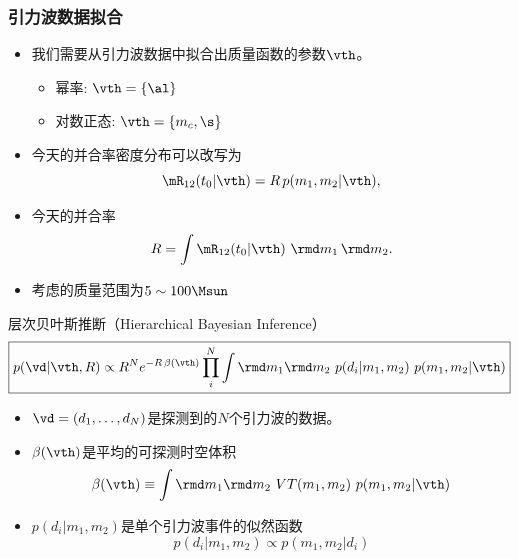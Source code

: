 \documentclass[xcolor={svgnames},compress]{beamer}
\let\olditem\item
\renewcommand{\item}{%
    \olditem\vspace{\fill}}
\begin{document}
\begin{frame}
    \frametitle{引力波数据拟合}
    \begin{itemize}
        \item 我们需要从引力波数据中拟合出质量函数的参数$\vth$。
        \begin{itemize}
            \item 幂率: $\vth = \{\al\}$
            \item 对数正态: $\vth = \{m_c, \s\}$
        \end{itemize}
        
        \item 今天的并合率密度分布可以改写为
        \[ 
        \mR_{12}(t_0|\vth) = R\, p(m_1,m_2|\vth),
        \]
        \item 今天的并合率
        \[
        R = \int \mR_{12}(t_0|\vth)\ \rmd m_1\, \rmd m_2.
        \]
        
        \item 考虑的质量范围为$5\sim 100 \Msun$
    \end{itemize}
    
\end{frame}

\begin{frame}{层次贝叶斯推断（Hierarchical Bayesian Inference）}
    \vspace{-7mm}
    \begin{equation*}\boxed{
            p(\vd|\vth, R) \propto R^{N} e^{-R\, \beta(\vth)} \prod_i^N 
            \int \rmd m_1 \rmd m_2\ p(d_i|m_1, m_2)\ p(m_1, m_2|\vth)
        }
    \end{equation*}
    
    \begin{itemize}
        \item $\vd = (d_1, \dots, d_N)$是探测到的$N$个引力波的数据。
        
        \item $\beta(\vth)$是平均的可探测时空体积
        \[ 
        \beta(\vth) \equiv \int \rmd m_1 \rmd m_2 \ VT(m_1, m_2)\ p(m_1, m_2|\vth)
        \]
        \item $p(d_i|m_1, m_2)$是单个引力波事件的似然函数
        \[
        p(d_i|m_1, m_2) \propto p(m_1, m_2|d_i)
        \]
    \end{itemize}	
    
\end{frame}
\end{document}
